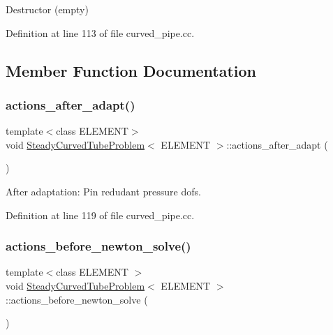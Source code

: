 Destructor (empty) 



Definition at line 113 of file curved\+\_\+pipe.\+cc.



\subsection{Member Function Documentation}
\mbox{\label{classSteadyCurvedTubeProblem_a536ebee9cdb86bb1533531c85e5fd125}} 
\subsubsection{\texorpdfstring{actions\+\_\+after\+\_\+adapt()}{actions\_after\_adapt()}}
{\footnotesize\ttfamily template$<$class E\+L\+E\+M\+E\+NT$>$ \\
void \hyperlink{classSteadyCurvedTubeProblem}{Steady\+Curved\+Tube\+Problem}$<$ E\+L\+E\+M\+E\+NT $>$\+::actions\+\_\+after\+\_\+adapt (\begin{DoxyParamCaption}{ }\end{DoxyParamCaption})\hspace{0.3cm}{\ttfamily [inline]}}



After adaptation\+: Pin redudant pressure dofs. 



Definition at line 119 of file curved\+\_\+pipe.\+cc.

\mbox{\label{classSteadyCurvedTubeProblem_a90f3197b2cd58a6d24d7064018db3bac}} 
\subsubsection{\texorpdfstring{actions\+\_\+before\+\_\+newton\+\_\+solve()}{actions\_before\_newton\_solve()}}
{\footnotesize\ttfamily template$<$class E\+L\+E\+M\+E\+NT $>$ \\
void \hyperlink{classSteadyCurvedTubeProblem}{Steady\+Curved\+Tube\+Problem}$<$ E\+L\+E\+M\+E\+NT $>$\+::actions\+\_\+before\+\_\+newton\+\_\+solve (\begin{DoxyParamCaption}{ }\end{DoxyParamCaption})}



